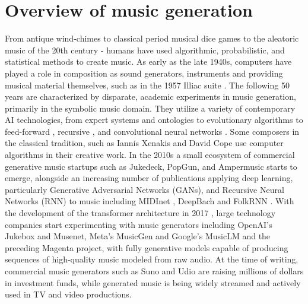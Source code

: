 \section{Overview of music generation} \label{section:music_generation_overview}
From antique wind-chimes to classical period musical dice games to the aleatoric music of the 20th century - humans have used algorithmic, probabilistic, and statistical methods to create music. As early as the late 1940s, computers have played a role in composition as sound generators, instruments \cite{France-Presse_2016} and providing musical material themselves, such as in the 1957 Illiac suite \cite{Hiller_Isaacson_1959}. The following 50 years are characterized by disparate, academic experiments in music generation, primarily in the symbolic music domain. They utilize a variety of contemporary AI technologies, from expert systems and ontologies \cite{Hiller_Isaacson_1959}\cite{Ebcioğlu_1994} to evolutionary algorithms \cite{Polito_Daida_Bersano-Begey_1997} to feed-forward \cite{Todd_1989}, recursive \cite{Mozer_1994}, and convolutional neural networks \cite{coconet}. Some composers in the classical tradition, such as Iannis Xenakis \cite{Xenakis_1992} and David Cope\cite{Cope_1989} use computer algorithms in their creative work. 
In the 2010s a small ecosystem of commercial generative music startups such as Jukedeck, PopGun, and Ampermusic \cite{Featherstone_2017} starts to emerge, alongside an increasing number of publications applying deep learning, particularly Generative Adversarial Networks (GANs), and Recursive Neural Networks (RNN) to music including MIDInet \cite{midinet}, DeepBach \cite{Hadjeres_Pachet_Nielsen_2017} and FolkRNN \cite{Sturm_Ben-Tal_2016}. With the development of the transformer architecture in 2017 \cite{Vaswani_Shazeer_Parmar_Uszkoreit_Jones_Gomez_Kaiser_Polosukhin_2017}, large technology companies start experimenting with music generators including OpenAI’s Jukebox \cite{Dhariwal_Jun_Payne_Kim_Radford_Sutskever_2020} and Musenet\cite{Christine_2019}, Meta’s MusicGen\cite{copet2023simple} and Google’s MusicLM \cite{Agostinelli_Denk_Borsos_Engel_Verzetti_Caillon_Huang_Jansen_Roberts_Tagliasacchi_et_al._2023} and the preceding Magenta project, with fully generative models capable of producing sequences of high-quality music modeled from raw audio. At the time of writing, commercial music generators such as Suno and Udio are raising millions of dollars in investment funds\cite{Stassen_2024}, while generated music is being widely streamed and actively used in TV and video productions. 

